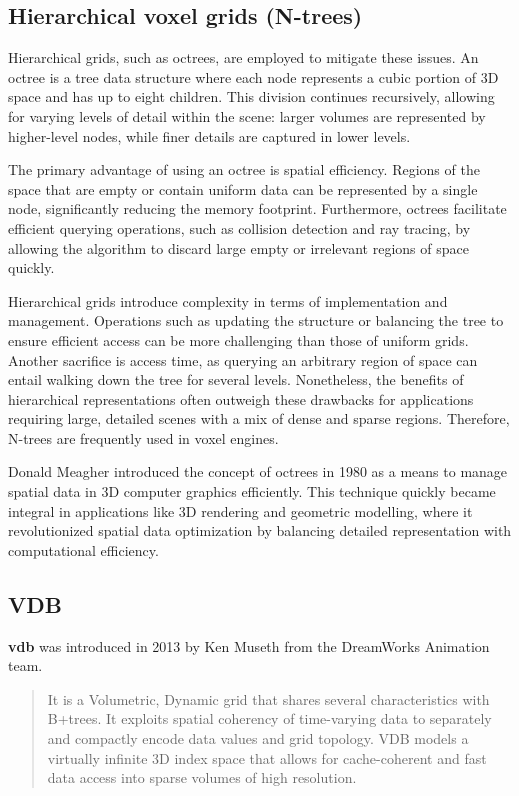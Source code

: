 \subsection{Hierarchical voxel grids (N-trees)}
Hierarchical grids, such as octrees, are employed to mitigate these issues. An octree is a tree data structure where each node represents a cubic portion of 3D space and has up to eight children. This division continues recursively, allowing for varying levels of detail within the scene: larger volumes are represented by higher-level nodes, while finer details are captured in lower levels.

The primary advantage of using an octree is spatial efficiency. Regions of the space that are empty or contain uniform data can be represented by a single node, significantly reducing the memory footprint. Furthermore, octrees facilitate efficient querying operations, such as collision detection and ray tracing, by allowing the algorithm to discard large empty or irrelevant regions of space quickly.

Hierarchical grids introduce complexity in terms of implementation and management. Operations such as updating the structure or balancing the tree to ensure efficient access can be more challenging than those of uniform grids.
Another sacrifice is access time, as querying an arbitrary region of space can entail walking down the tree for several levels.
Nonetheless, the benefits of hierarchical representations often outweigh these drawbacks for applications requiring large, detailed scenes with a mix of dense and sparse regions. Therefore, N-trees are frequently used in voxel engines.

Donald Meagher introduced the concept of octrees in 1980\supercite{donald} as a means to manage spatial data in 3D computer graphics efficiently. This technique quickly became integral in applications like 3D rendering and geometric modelling, where it revolutionized spatial data optimization by balancing detailed representation with computational efficiency.

\subsection{VDB}

\textbf{\acrshort{vdb}} was introduced in 2013 by Ken Museth\supercite{vdb2013} from the DreamWorks Animation team.
\begin{quote}
It is a Volumetric, Dynamic grid that shares several characteristics with B+trees.
It exploits spatial coherency of time-varying data to separately and compactly encode data values and grid topology.
VDB models a virtually infinite 3D index space that allows for cache-coherent and fast data access into sparse volumes of high resolution.
\end{quote}


